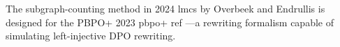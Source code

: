 The subgraph-counting method in 2024 lmcs by Overbeek and Endrullis is designed for the PBPO+ 2023 pbpo+ ref —a rewriting formalism capable of simulating left-injective DPO rewriting.